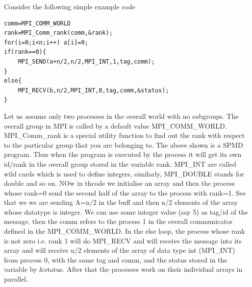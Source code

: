 \documentclass[12pt]{article}
\begin{document}
Consider the following simple example code
\begin{lstlisting}
comm=MPI_COMM_WORLD
rank=MPI_Comm_rank(comm,&rank);
for(i=0;i<n;i++) a[i]=0;
if(rank==0){
    MPI_SEND(a+n/2,n/2,MPI_INT,1,tag,comm);
}
else{
    MPI_RECV(b,n/2,MPI_INT,0,tag,comm,&status);
}
\end{lstlisting}
Let us assume only two processes in the overall world with no subgroups. The overall group in MPI is called by a default value MPI\_COMM\_WORLD.
MPI\_Comm\_rank is a special utility function to find out the rank with respect to the particular group that you are belonging to. The above shown is a SPMD program. Thus when the program is executed by the process it will get its own id/rank in the overall group stored in the variable rank. MPI\_INT are called wild cards which is used to define integers, similarly, MPI\_DOUBLE stands for double and so on. NOw in thcode we initialise an array and then the process whose rank=0 send the second half of the array to the process with rank=1. See that we we are sending A=n/2 in the buff and then n/2 elements of the array whose datatype is integer. We can use some integer value (say 5) as tag/id of the message, then the comm refers to the process 1 in the overall communicator defined in the MPI\_COMM\_WORLD. In the else loop, the process whose rank is not zero i.e. rank 1 will do MPI\_RECV and will receive the message into its array and will receive n/2 elements of the array of data type int (MPI\_INT) from process 0, with the same tag and comm, and the status stored in the variable by \&status. After that the processes work on their individual arrays in parallel.










    









\newpage
\end{document}
